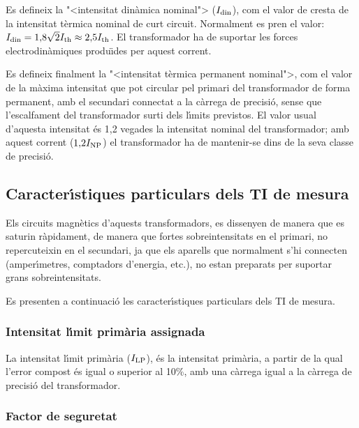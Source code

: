 Es defineix la {"<}intensitat din\`{a}mica nominal{">} ($I_\mathrm{din}$), com el
valor de cresta de la intensitat t\`{e}rmica nominal de curt circuit.
Normalment es pren el valor: $I_\mathrm{din} =
1{,}8\sqrt{2}I_\mathrm{th}\approx2{,}5I_\mathrm{th}$. El transformador ha de
suportar les forces electrodin\`{a}miques produ\"{\i}des per aquest corrent.

Es defineix finalment la {"<}intensitat t\`{e}rmica permanent nominal{">}, com
el valor de la m\`{a}xima intensitat que pot circular pel primari del
transformador  de forma permanent, amb el secundari connectat a la
c\`{a}rrega de precisi\'{o}, sense que l'escalfament del transformador surti
dels l\'{\i}mits previstos. El valor usual d'aquesta intensitat \'{e}s 1,2
vegades la intensitat nominal del transformador; amb aquest corrent
($1{,}2I_\mathrm{NP}$)  el transformador ha de mantenir-se dins de la
seva classe de precisi\'{o}.

\subsection{Caracter\'{\i}stiques particulars dels TI de mesura}

Els circuits magn\`{e}tics d'aquests transformadors, es dissenyen de
manera que es saturin r\`{a}pidament, de manera que fortes
sobreintensitats en el primari,  no repercuteixin en el secundari,
ja que els aparells que normalment s'hi connecten (amper\'{\i}metres,
comptadors d'energia, etc.), no estan preparats per suportar grans
sobreintensitats.

Es presenten a continuaci\'{o} les caracter\'{\i}stiques particulars dels TI
de mesura.

\subsubsection{Intensitat l\'{\i}mit prim\`{a}ria  assignada}

 La intensitat l\'{\i}mit prim\`{a}ria
($I_\mathrm{LP}$),
\'{e}s la intensitat prim\`{a}ria, a partir de la qual l'error compost \'{e}s igual
o superior al 10\unit{\%}, amb una c\`{a}rrega igual a la c\`{a}rrega de
precisi\'{o} del transformador.

\subsubsection{Factor de seguretat}

